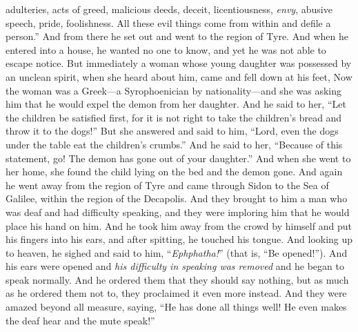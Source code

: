 \begin{biblechapter}
\verse adulteries, acts of greed, malicious deeds, deceit, licentiousness, \textit{envy}, abusive speech, pride, foolishness.
\verse All these evil things come from within and defile a person.”
 And from there he set out and went to the region of Tyre. And when he entered into a house, he wanted no one to know, and yet he was not able to escape notice.
\verse But immediately a woman whose young daughter was possessed by an unclean spirit, when she heard about him, came and fell down at his feet,
\verse Now the woman was a Greek—a Syrophoenician by nationality—and she was asking him that he would expel the demon from her daughter.
\verse And he said to her, “Let the children be satisfied first, for it is not right to take the children’s bread and throw it to the dogs!”
\verse But she answered and said to him, “Lord, even the dogs under the table eat the children’s crumbs.”
\verse And he said to her, “Because of this statement, go! The demon has gone out of your daughter.”
\verse And when she went to her home, she found the child lying on the bed and the demon gone.
 And again he went away from the region of Tyre and came through Sidon to the Sea of Galilee, within the region of the Decapolis.
\verse And they brought to him a man who was deaf and had difficulty speaking, and they were imploring him that he would place his hand on him.
\verse And he took him away from the crowd by himself and put his fingers into his ears, and after spitting, he touched his tongue.
\verse And looking up to heaven, he sighed and said to him, “\textit{Ephphatha!}” (that is, “Be opened!”).
\verse And his ears were opened and \textit{his difficulty in speaking was removed} and he began to speak normally.
\verse And he ordered them that they should say nothing, but as much as he ordered them not to, they proclaimed it even more instead.
\verse And they were amazed beyond all measure, saying, “He has done all things well! He even makes the deaf hear and the mute speak!”
\end{biblechapter}

